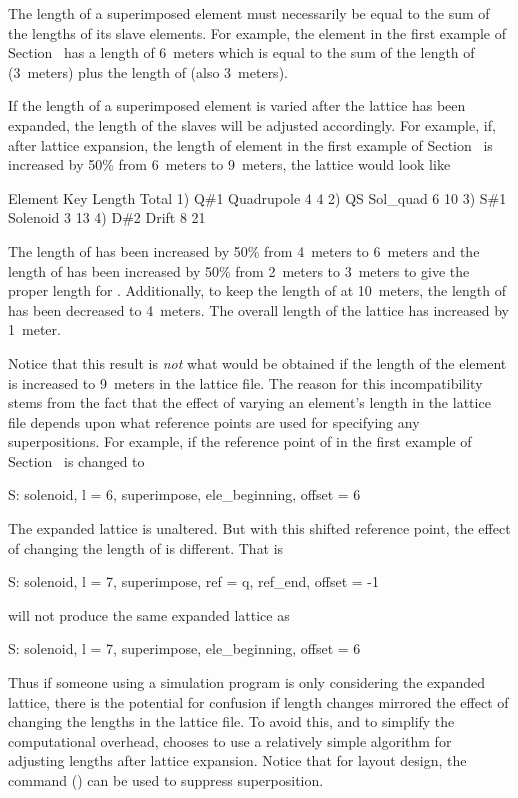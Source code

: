 The length of a superimposed element must necessarily be equal to the
sum of the lengths of its slave elements. For example, the element
 in the first example of Section~ has a length of
6~meters which is equal to the sum of the length of 
(3~meters) plus the length of  (also 3~meters).

If the length of a superimposed element is varied after the lattice
has been expanded, the length of the slaves will be adjusted
accordingly. For example, if, after lattice expansion, the length of
element  in the first example of Section~ is
increased by 50\% from 6~meters to 9~meters, the lattice would look
like
\begin{example}
        Element   Key         Length  Total
  1)    Q{\#}1       Quadrupole   4        4
  2)    Q{\B}S       Sol_quad     6       10
  3)    S{\#}1       Solenoid     3       13
  4)    D{\#}2       Drift        8       21
\end{example}
The length of  has been increased by 50\% from 4~meters to
6~meters and the length of  has been increased by 50\% from
2~meters to 3~meters to give the proper length for .
Additionally, to keep the length of  at 10~meters, the
length of  has been decreased to 4~meters. The overall
length of the lattice has increased by 1~meter.

Notice that this result is {\em not} what would be obtained if the
length of the element  is increased to 9~meters in the lattice
file. The reason for this incompatibility stems from the fact that the
effect of varying an element's length in the lattice file depends upon
what reference points are used for specifying any superpositions. For
example, if the reference point of  in the first example of
Section~ is changed to
\begin{example}
  S: solenoid, l = 6, superimpose, ele_beginning, offset = 6
\end{example}
The expanded lattice is unaltered. But with this shifted reference
point, the effect of changing the length of  is different. That is
\begin{example}
  S: solenoid, l = 7, superimpose, ref = q, ref_end, offset = -1
\end{example}
will not produce the same expanded lattice as
\begin{example}
  S: solenoid, l = 7, superimpose, ele_beginning, offset = 6
\end{example}
Thus if someone using a simulation program is only considering the
expanded lattice, there is the potential for confusion if length
changes mirrored the effect of changing the lengths in the lattice
file.  To avoid this, and to simplify the computational overhead,
\bmad chooses to use a relatively simple algorithm for adjusting
lengths after lattice expansion. Notice that for layout design, the
 command () can be used to
suppress superposition.

